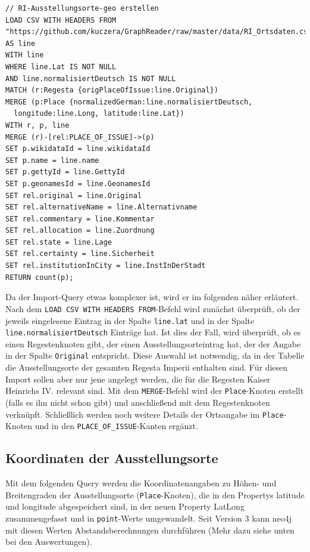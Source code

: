 \documentclass[ngerman,]{scrreprt}
\begin{document}
\begin{verbatim}
// RI-Ausstellungsorte-geo erstellen
LOAD CSV WITH HEADERS FROM "https://github.com/kuczera/GraphReader/raw/master/data/RI_Ortsdaten.csv"
AS line
WITH line
WHERE line.Lat IS NOT NULL
AND line.normalisiertDeutsch IS NOT NULL
MATCH (r:Regesta {origPlaceOfIssue:line.Original})
MERGE (p:Place {normalizedGerman:line.normalisiertDeutsch,
  longitude:line.Long, latitude:line.Lat})
WITH r, p, line
MERGE (r)-[rel:PLACE_OF_ISSUE]->(p)
SET p.wikidataId = line.wikidataId
SET p.name = line.name
SET p.gettyId = line.GettyId
SET p.geonamesId = line.GeonamesId
SET rel.original = line.Original
SET rel.alternativeName = line.Alternativname
SET rel.commentary = line.Kommentar
SET rel.allocation = line.Zuordnung
SET rel.state = line.Lage
SET rel.certainty = line.Sicherheit
SET rel.institutionInCity = line.InstInDerStadt
RETURN count(p);
\end{verbatim}

Da der Import-Query etwas komplexer ist, wird er im folgenden näher erläutert. Nach dem \texttt{LOAD\ CSV\ WITH\ HEADERS\ FROM}-Befehl wird zunächst überprüft, ob der jeweils eingelesene Eintrag in der Spalte \texttt{line.lat} und in der Spalte \texttt{line.normalisiertDeutsch} Einträge hat. Ist dies der Fall, wird überprüft, ob es einen Regestenknoten gibt, der einen Ausstellungsorteintrag hat, der der Angabe in der Spalte \texttt{Original} entspricht. Diese Auswahl ist notwendig, da in der Tabelle die Ausstellungsorte der gesamten Regesta Imperii enthalten sind. Für diesen Import sollen aber nur jene angelegt werden, die für die Regesten Kaiser Heinrichs IV. relevant sind. Mit dem \texttt{MERGE}-Befehl wird der \texttt{Place}-Knoten erstellt (falls es ihn nicht schon gibt) und anschließend mit dem Regestenknoten verknüpft. Schließlich werden noch weitere Details der Ortsangabe im \texttt{Place}-Knoten und in den \texttt{PLACE\_OF\_ISSUE}-Kanten ergänzt.

\hypertarget{koordinaten-der-ausstellungsorte}{%
\subsection{Koordinaten der Ausstellungsorte}\label{koordinaten-der-ausstellungsorte}}

Mit dem folgenden Query werden die Koordinatenangaben zu Höhen- und Breitengraden der Ausstellungsorte (\texttt{Place}-Knoten), die in den Propertys latitude und longitude abgespeichert sind, in der neuen Property LatLong zusammengefasst und in \texttt{point}-Werte umgewandelt. Seit Version 3 kann neo4j mit diesen Werten Abstandsberechnungen durchführen (Mehr dazu siehe unten bei den Auswertungen).
\end{document}
